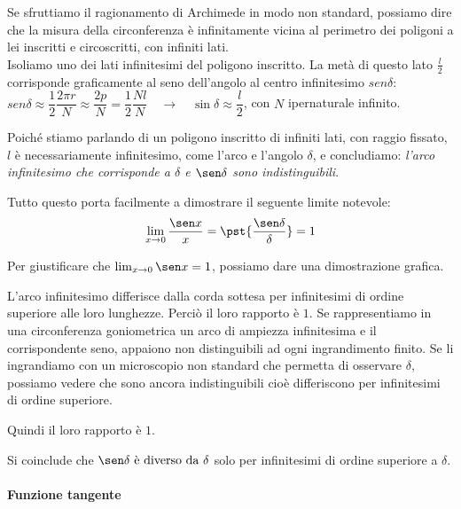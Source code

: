 Se sfruttiamo il ragionamento di Archimede in modo non standard, possiamo dire 
che la misura della circonferenza è infinitamente vicina al perimetro dei 
poligoni a lei inscritti e circoscritti, con infiniti lati.\\
Isoliamo uno dei lati infinitesimi del poligono inscritto. La 
metà di questo lato \(\frac{l}{2}\) corrisponde graficamente al seno 
dell'angolo al centro infinitesimo \(sen \delta\):\\
\(sen \delta \approx \dfrac{1}{2}\dfrac{2\pi r}{N}\approx \dfrac{2p}{N}=
\dfrac{1}{2}\dfrac{Nl}{N}\quad \rightarrow\quad
\sin \delta \approx\dfrac{l}{2}\),\quad
con \(N\) ipernaturale infinito.  

Poiché stiamo parlando di un poligono inscritto di infiniti lati, con 
raggio fissato, \(l\) è necessariamente infinitesimo, come l'arco e l'angolo 
\(\delta\), e concludiamo: \emph{l'arco infinitesimo che corrisponde a  
\(\delta\) e \(\sen\delta\) sono indistinguibili}.

Tutto questo porta facilmente a dimostrare il seguente limite notevole:
\[\lim_{x \rightarrow 0}\frac{\sen x}{x} = 
  \pst{\frac{\sen \delta}{\delta}} = 1\]
  
Per giustificare che \(\lim_{x \rightarrow 0}{\sen x}=1\), possiamo dare una 
dimostrazione grafica.

\begin{minipage}{.49\textwidth}
L'arco infinitesimo differisce dalla corda sottesa per infinitesimi di ordine 
superiore alle loro lunghezze. Perciò il loro rapporto è \(1\).
Se rappresentiamo in una circonferenza goniometrica un arco di ampiezza 
infinitesima e il corrispondente seno, appaiono non distinguibili ad ogni 
ingrandimento finito. 
Se li ingrandiamo con un microscopio non standard che permetta di 
osservare \(\delta\), possiamo vedere che sono ancora indistinguibili 
cioè differiscono per infinitesimi di ordine superiore. 

Quindi il loro rapporto è \(1\).
\end{minipage}
\hfill
\begin{minipage}{.49\textwidth}
\begin{center} \limiteseno \end{center}
\end{minipage}

Si coinclude che \(\sen \delta \text{ è diverso da } \delta\) solo per 
infinitesimi di ordine superiore a \(\delta\).

\paragraph{Funzione tangente}~

